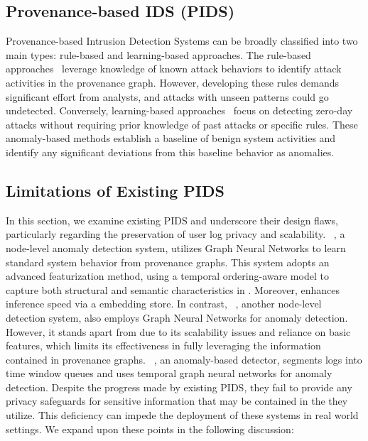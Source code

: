 

\subsection{Provenance-based IDS (PIDS)}


Provenance-based Intrusion Detection Systems can be broadly classified into two main types: rule-based and learning-based approaches. The rule-based approaches~\cite{holmes2019,rapsheet2020,poirot2019} leverage knowledge of known attack behaviors to identify attack activities in the provenance graph. However, developing these rules demands significant effort from analysts, and attacks with unseen patterns could go undetected. Conversely, learning-based approaches~\cite{wang2022threatrace,flash2024,cheng2023kairos,yangprographer,shadewatcher} focus on detecting zero-day attacks without requiring prior knowledge of past attacks or specific rules. These anomaly-based methods establish a baseline of benign system activities and identify any significant deviations from this baseline behavior as anomalies.

\subsection{Limitations of Existing PIDS}
In this section, we examine existing PIDS and underscore their design flaws, particularly regarding the preservation of user log privacy and scalability. \flash~\cite{flash2024}, a node-level anomaly detection system, utilizes Graph Neural Networks to learn standard system behavior from provenance graphs. This system adopts an advanced featurization method, using a temporal ordering-aware \wordvec model to capture both structural and semantic characteristics in \logs. Moreover, \flash enhances inference speed via a \gnnshort embedding store. In contrast, \threatrace~\cite{wang2022threatrace}, another node-level detection system, also employs Graph Neural Networks for anomaly detection. However, it stands apart from \flash due to its scalability issues and reliance on basic features, which limits its effectiveness in fully leveraging the information contained in provenance graphs. \kairos~\cite{cheng2023kairos}, an anomaly-based detector, segments logs into time window queues and uses temporal graph neural networks for anomaly detection. Despite the progress made by existing PIDS, they fail to provide any privacy safeguards for sensitive information that may be contained in the \logs they utilize. This deficiency can impede the deployment of these systems in real world settings. We expand upon these points in the following discussion: 

